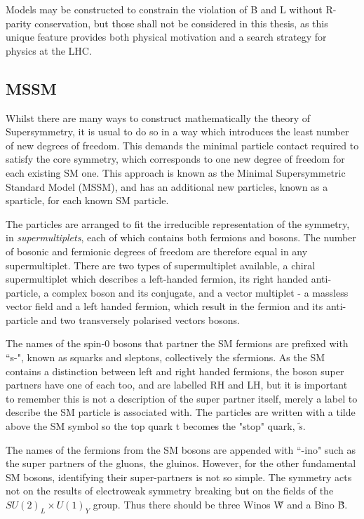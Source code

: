 Models may be constructed to constrain the violation of B and L without R-parity conservation, but those shall not be considered in this thesis, as this unique feature provides both physical motivation and a search strategy for physics at the LHC.


\subsection{MSSM} 

Whilst there are many ways to construct mathematically the theory of Supersymmetry, it is usual to do so in a way which introduces the least number of new degrees of freedom. This demands the minimal particle contact required to satisfy the core symmetry, which corresponds to one new degree of freedom for each existing SM one. This approach is known as the Minimal Supersymmetric Standard Model (MSSM), and has an additional new particles, known as a sparticle, for each known SM particle. 

The particles are arranged to fit the irreducible representation of the symmetry, in \textit{supermultiplets}, each of which contains both fermions and bosons. The number of bosonic and fermionic degrees of freedom are therefore equal in any supermultiplet. There are two types of supermultiplet available, a chiral supermultiplet which describes a left-handed fermion, its right handed anti-particle, a complex boson and its conjugate, and a vector multiplet - a massless vector field and a left handed fermion, which result in the fermion and its anti-particle and two transversely polarised vectors bosons\cite{SUSYPrime}. 

The names of the spin-0 bosons that partner the SM fermions are prefixed with ``s-", known as squarks and sleptons, collectively the sfermions. As the SM contains a distinction between left and right handed fermions, the boson super partners have one of each too, and are labelled RH and LH, but it is important to remember this is not a description of the super partner itself, merely a label to describe the SM particle is associated with. The particles are written with a tilde above the SM symbol so the top quark t becomes the "stop" quark, $\tilde{s}$.

The names of the fermions from the SM bosons are appended with ``-ino" such as the super partners of the gluons, the gluinos. However, for the other fundamental SM bosons, identifying their super-partners is not so simple. The symmetry acts not on the results of electroweak symmetry breaking but on the fields of the $SU(2)_{L} \times U(1)_{Y}$ group. Thus there should be three Winos \~{W} and a Bino \~{B}. 


